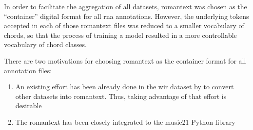 
In order to facilitate the aggregation of all datasets,
\gls{romantext} was chosen as the ``container'' digital
format for all \gls{rna} annotations. However, the
underlying tokens accepted in each of those \gls{romantext}
files was reduced to a smaller vocabulary of chords, so that
the process of training a model resulted in a more
controllable vocabulary of chord classes.

There are two motivations for choosing \gls{romantext} as
the container format for all annotation files:

\begin{enumerate}
    \item An existing effort has been already done in the
    \gls{wir} dataset by \textcite{gotham2019romantext,
    gotham2022openscore} to convert other datasets into
    \gls{romantext}. Thus, taking advantage of that effort
    is desirable
    \item The \gls{romantext} has been closely integrated to
    the music21 Python library \parencite{cuthbert2010music21}
\end{enumerate}